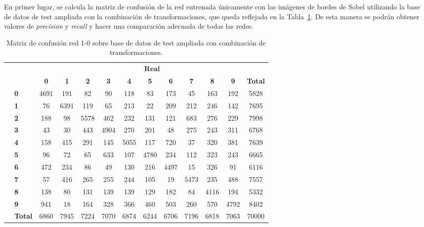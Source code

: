 En primer lugar, se calcula la matriz de confusión de la red entrenada únicamente con las imágenes de bordes de Sobel utilizando la base de datos de test ampliada con la combinación de transformaciones, que queda reflejada en la Tabla~\ref{tab.matriz1-0}. De esta manera se podrán obtener valores de \textit{precision} y \textit{recall}  y hacer una comparación adecuada de todas las redes.\\
\begin{table}[H]
	\centering
	\begin{tabular}{|c|l|c|c|c|c|c|c|c|c|c|c|c|}
		\cline{3-13} 
		\multicolumn{2}{c|}{} & \multicolumn{11}{c|}{\textbf{Real}} \\ \cline{3-13} 
		\multicolumn{2}{c|}{} & \textbf{0} & \textbf{1} & \textbf{2} &  \textbf{3} & \textbf{4} & \textbf{5} & \textbf{6} & \textbf{7} & \textbf{8} & \textbf{9} & \textbf{Total}\\ \hline
		\multirow{10}{0.5cm}{\rotatebox{90}{\textbf{Predicción}}}& \textbf{0} &  \cellcolor{lightgray}4691 & 191 & 82 & 90 & 118 & 83 & 173 & 45 & 163 & 192 & 5828\\ \cline{2-13}
		& \textbf{1} & 76 & \cellcolor{lightgray}6391 & 119 & 65 & 213 & 22 & 209 & 212 & 246 & 142 & 7695\\ \cline{2-13}
		& \textbf{2} & 188 & 98 & \cellcolor{lightgray}5578 & 462 & 232 & 131 & 121 & 683 & 276 & 229 & 7998\\ \cline{2-13}
		& \textbf{3} & 43 & 30 & 443 & \cellcolor{lightgray}4904 & 270 & 201 & 48 & 275 & 243 & 311 & 6768\\ \cline{2-13}
		& \textbf{4} & 158 & 415 & 291 & 145 & \cellcolor{lightgray}5055 & 117 & 720 & 37 & 320 & 381 & 7639\\ \cline{2-13}
		& \textbf{5} & 96 & 72 & 65 & 633 & 107 & \cellcolor{lightgray}4780 & 234 & 112 & 323 & 243 & 6665\\ \cline{2-13}
		& \textbf{6} & 472 & 234 & 86 & 49 & 130 & 216 & \cellcolor{lightgray}4497 & 15 & 326 & 91 & 6116\\ \cline{2-13}
		& \textbf{7} & 57 & 416 & 265 & 255 & 244 & 105 & 19 & \cellcolor{lightgray}5473 & 235 & 488 & 7557\\ \cline{2-13}
		& \textbf{8} & 138 & 80 & 131 & 139 & 139 & 129 & 182 & 84 & \cellcolor{lightgray}4116 & 194 & 5332\\ \cline{2-13}
		& \textbf{9} & 941 & 18 & 164 & 328 & 366 & 460 & 503 & 260 & 570 & \cellcolor{lightgray}4792 & 8402\\ \cline{2-13} 
		& \textbf{Total} & 6860 & 7945 & 7224 & 7070 & 6874 & 6244 & 6706 & 7196 & 6818 & 7063 & 70000\\ \hline
	\end{tabular}
	\caption{Matriz de confusión red 1-0 sobre base de datos de test ampliada con combinación de transformaciones.}
	\label{tab.matriz1-0}
\end{table}

